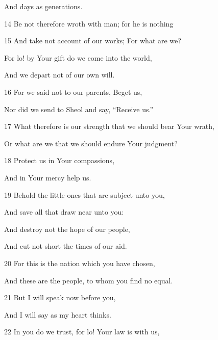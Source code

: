\par And days as generations.

\par 14 Be not therefore wroth with man; for he is nothing

\par 15 And take not account of our works; For what are we?

\par For lo! by Your gift do we come into the world,

\par And we depart not of our own will.

\par 16 For we said not to our parents, Beget us,

\par Nor did we send to Sheol and say, “Receive us.”

\par 17 What therefore is our strength that we should bear Your wrath,

\par Or what are we that we should endure Your judgment?

\par 18 Protect us in Your compassions,

\par And in Your mercy help us.

\par 19 Behold the little ones that are subject unto you,

\par And save all that draw near unto you:

\par And destroy not the hope of our people,

\par And cut not short the times of our aid.

\par 20 For this is the nation which you have chosen,

\par And these are the people, to whom you find no equal.

\par 21 But I will speak now before you,

\par And I will say as my heart thinks.

\par 22 In you do we trust, for lo! Your law is with us,

